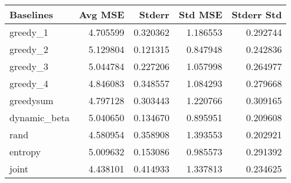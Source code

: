 \begin{tabular}{lrrrr}
\toprule
    Baselines &   Avg MSE &    Stderr &   Std MSE &  Stderr Std \\
\midrule
     greedy\_1 &  4.705599 &  0.320362 &  1.186553 &    0.292744 \\
     greedy\_2 &  5.129804 &  0.121315 &  0.847948 &    0.242836 \\
     greedy\_3 &  5.044784 &  0.227206 &  1.057998 &    0.264977 \\
     greedy\_4 &  4.846083 &  0.348557 &  1.084293 &    0.279668 \\
   greedysum &  4.797128 &  0.303443 &  1.220766 &    0.309165 \\
 dynamic\_beta &  5.040650 &  0.134670 &  0.895951 &    0.209608 \\
         rand &  4.580954 &  0.358908 &  1.393553 &    0.202921 \\
      entropy &  5.009632 &  0.153086 &  0.985573 &    0.291392 \\
        joint &  4.438101 &  0.414933 &  1.337813 &    0.234625 \\
\bottomrule
\end{tabular}
